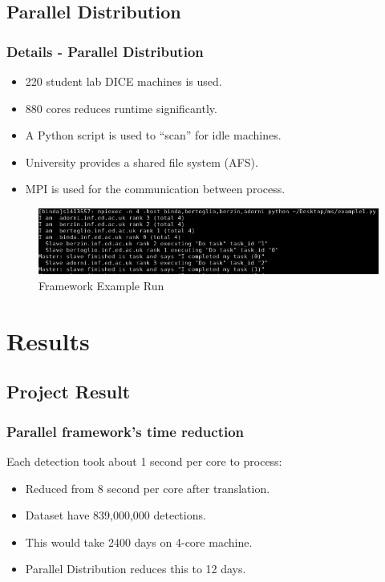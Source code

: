 \documentclass{beamer}[fullspacing]
\begin{document}
\subsection{Parallel Distribution}

\begin{frame}
\frametitle{Details - Parallel Distribution}

\begin{itemize}
\item
220 student lab DICE machines is used.
\item
880 cores reduces runtime significantly.
\item
A Python script is used to ``scan'' for idle machines.
\item
University provides a shared file system (AFS).
\item
MPI is used for the communication between process.
\end{itemize}

\begin{figure}
\includegraphics[scale=0.4]{image/mpi.png}
\caption{Framework Example Run}
\end{figure}

\end{frame}



\section{Results}
\subsection{Project Result}

\begin{frame}
\frametitle{Parallel framework's time reduction}

Each detection took about 1 second per core to process:
\begin{itemize}
\item
Reduced from 8 second per core after translation.
\item
Dataset have 839,000,000 detections.
\item
This would take 2400 days on 4-core machine. 
\item
Parallel Distribution reduces this to 12 days.
\end{itemize}

\end{frame}
\end{document}
